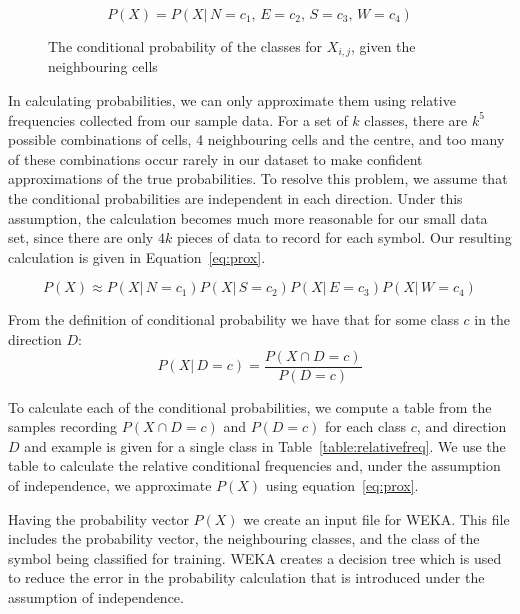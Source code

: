 \[
P(X) = P(X|\,N\!=\!c_1,\,E\!=\!c_2,\,S\!=\!c_3,\,W\!=\!c_4)
\]

\begin{figure}[h]
\begin{center}
\end{center}
\caption{The conditional probability of the classes for $X_{i,j}$, given the neighbouring cells}
\label{fig:conditionalprob}
\end{figure}


In calculating probabilities, we can only approximate them using relative
frequencies collected from our sample data. For a set of $k$ classes, there are
$k^5$ possible combinations of cells, 4 neighbouring cells and the centre, and
too many of these combinations occur rarely in our dataset to make confident
approximations of the true probabilities. To resolve this problem, we assume
that the conditional probabilities are independent in each direction. Under
this assumption, the calculation becomes much more reasonable for our small
data set, since there are only $4k$ pieces of data to record for each symbol.
Our resulting calculation is given in Equation~\ref{eq:prox}.

\begin{equation}
\label{eq:prox}
P(X) \approx P(X|\,N\!=\!c_1)P(X|\,S\!=\!c_2)P(X|\,E\!=\!c_3)P(X|\,W\!=\!c_4)
\end{equation}

From the definition of conditional probability we have that for some class $c$ in
the direction $D$:
\[
P(X|\,D\!=\!c) = \frac{P(X \cap D\!=\!c)}{P(D=c)}
\]

To calculate each of the conditional probabilities, we compute a table from the
samples recording $P(X\cap D\!=\!c)$ and $P(D\!=\!c)$ for each class  $c$, and
direction $D$ and example is given for a single class in
Table~\ref{table:relativefreq}.  We use the table to calculate the relative
conditional frequencies and, under the assumption of independence, we
approximate $P(X)$ using equation~\ref{eq:prox}.

Having the probability vector $P(X)$ we create an input file for WEKA.  This
file includes the probability vector, the neighbouring classes, and the class
of the symbol being classified for training. WEKA creates a decision tree which
is used to reduce the error in the probability calculation that is introduced
under the assumption of independence.

